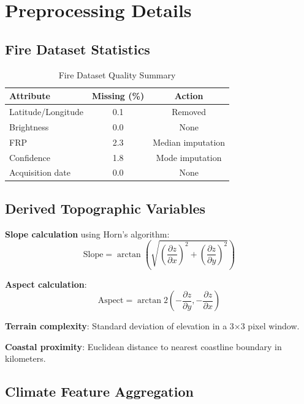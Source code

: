 \chapter{Preprocessing Details}
\label{app:preprocessing}

\section*{Fire Dataset Statistics}
\begin{table}[H]
\centering
\caption{Fire Dataset Quality Summary}
\begin{tabular}{|l|c|c|}
\hline
\textbf{Attribute} & \textbf{Missing (\%)} & \textbf{Action} \\
\hline
Latitude/Longitude & 0.1 & Removed \\
Brightness & 0.0 & None \\
FRP & 2.3 & Median imputation \\
Confidence & 1.8 & Mode imputation \\
Acquisition date & 0.0 & None \\
\hline
\end{tabular}
\end{table}

\section*{Derived Topographic Variables}

\textbf{Slope calculation} using Horn's algorithm:
\begin{equation}
    \text{Slope} = \arctan\left(\sqrt{\left(\frac{\partial z}{\partial x}\right)^2 + \left(\frac{\partial z}{\partial y}\right)^2}\right)
\end{equation}

\textbf{Aspect calculation}:
\begin{equation}
    \text{Aspect} = \arctan2\left(-\frac{\partial z}{\partial y}, -\frac{\partial z}{\partial x}\right)
\end{equation}

\textbf{Terrain complexity}: Standard deviation of elevation in a 3×3 pixel window.

\textbf{Coastal proximity}: Euclidean distance to nearest coastline boundary in kilometers.

\section*{Climate Feature Aggregation}

